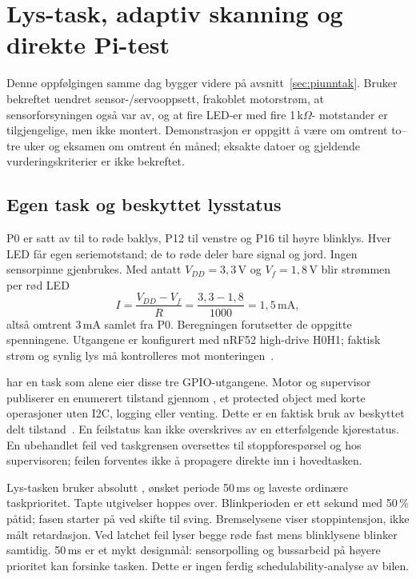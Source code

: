 \section{Lys-task, adaptiv skanning og direkte Pi-test}
\label{sec:lysskann}
Denne oppfølgingen samme dag bygger videre på avsnitt~\ref{sec:piunntak}.
Bruker bekreftet uendret sensor-/servooppsett, frakoblet motorstrøm, at
sensorforsyningen også var av, og at fire LED-er med fire 1\,k$\Omega$-
motstander er tilgjengelige, men ikke montert. Demonstrasjon er oppgitt å
være om omtrent to--tre uker og eksamen om omtrent én måned; eksakte datoer
og gjeldende vurderingskriterier er ikke bekreftet.

\subsection{Egen task og beskyttet lysstatus}
P0 er satt av til to røde baklys, P12 til venstre og P16 til høyre blinklys.
Hver LED får egen seriemotstand; de to røde deler bare signal og jord.
Ingen sensorpinne gjenbrukes. Med antatt $V_{DD}=3{,}3$\,V og
$V_f=1{,}8$\,V blir strømmen per rød LED
\[
 I=\frac{V_{DD}-V_f}{R}=\frac{3{,}3-1{,}8}{1000}=1{,}5\,\mathrm{mA},
\]
altså omtrent 3\,mA samlet fra P0. Beregningen forutsetter de oppgitte
spenningene. Utgangene er konfigurert med nRF52 high-drive H0H1; faktisk
strøm og synlig lys må kontrolleres mot monteringen~\cite{pins}.

 har en task som alene eier disse tre GPIO-utgangene.
Motor og supervisor publiserer en enumerert tilstand gjennom
, et protected object med korte
operasjoner uten I2C, logging eller venting. Dette er en faktisk bruk av
beskyttet delt tilstand~\cite{adaprotected2026}. En feilstatus kan ikke
overskrives av en etterfølgende kjørestatus. En ubehandlet feil ved
taskgrensen oversettes til stoppforespørsel og 
hos supervisoren; feilen forventes ikke å propagere direkte inn i hovedtasken.

Lys-tasken bruker absolutt , ønsket periode 50\,ms og
laveste ordinære taskprioritet. Tapte utgivelser hoppes over. Blinkperioden
er ett sekund med 50\,\% påtid; fasen starter på ved skifte til sving.
Bremselysene viser stoppintensjon, ikke målt retardasjon. Ved latchet feil
lyser begge røde fast mens blinklysene blinker samtidig.
50\,ms er et mykt designmål: sensorpolling og bussarbeid på høyere prioritet
kan forsinke tasken. Dette er ingen ferdig schedulability-analyse av bilen.

